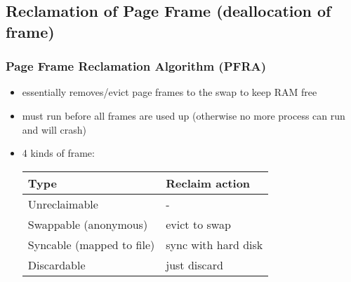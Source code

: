 \documentclass[11pt]{article}
\begin{document}
\subsection{Reclamation of Page Frame (deallocation of frame)}
\label{sec:orgdec4eab}
\subsubsection{Page Frame Reclamation Algorithm (PFRA)}
\label{sec:org0171cca}
\begin{itemize}
\item essentially removes/evict page frames to the swap to keep RAM free
\item must run before all frames are used up (otherwise no more process can run and
will crash)
\item 4 kinds of frame:
\begin{center}
\begin{tabular}{ll}
Type & Reclaim action\\
\hline
Unreclaimable & -\\
Swappable (anonymous) & evict to swap\\
Syncable (mapped to file) & sync with hard disk\\
Discardable & just discard\\
\end{tabular}
\end{center}
\end{itemize}
\end{document}
